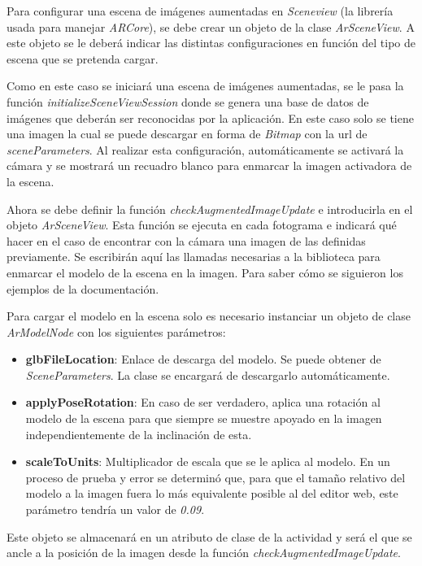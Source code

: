 Para configurar una escena de imágenes aumentadas en \textit{Sceneview} (la librería usada para manejar \textit{ARCore}), se debe crear un objeto de la clase \textit{ArSceneView}. A este objeto se le deberá indicar las distintas configuraciones en función del tipo de escena que se pretenda cargar.

Como en este caso se iniciará una escena de imágenes aumentadas, se le pasa la función \textit{initializeSceneViewSession} donde se genera una base de datos de imágenes que deberán ser reconocidas por la aplicación. En este caso solo se tiene una imagen la cual se puede descargar en forma de \textit{Bitmap} con la url de \textit{sceneParameters}. Al realizar esta configuración, automáticamente se activará la cámara y se mostrará un recuadro blanco para enmarcar la imagen activadora de la escena.

Ahora se debe definir la función \textit{checkAugmentedImageUpdate} e introducirla en el objeto \textit{ArSceneView}. Esta función se ejecuta en cada fotograma e indicará qué hacer en el caso de encontrar con la cámara una imagen de las definidas previamente. Se escribirán aquí las llamadas necesarias a la biblioteca para enmarcar el modelo de la escena en la imagen. Para saber cómo se siguieron los ejemplos de la documentación.

Para cargar el modelo en la escena solo es necesario instanciar un objeto de clase \textit{ArModelNode} con los siguientes parámetros:

\begin{itemize}
    \item \textbf{glbFileLocation}: Enlace de descarga del modelo. Se puede obtener de \textit{SceneParameters}. La clase se encargará de descargarlo automáticamente.
    \item \textbf{applyPoseRotation}: En caso de ser verdadero, aplica una rotación al modelo de la escena para que siempre se muestre apoyado en la imagen independientemente de la inclinación de esta.
    \item \textbf{scaleToUnits}: Multiplicador de escala que se le aplica al modelo. En un proceso de prueba y error se determinó que, para que el tamaño relativo del modelo a la imagen fuera lo más equivalente posible al del editor web, este parámetro tendría un valor de \textit{0.09}.
\end{itemize}

Este objeto se almacenará en un atributo de clase de la actividad y será el que se ancle a la posición de la imagen desde la función \textit{checkAugmentedImageUpdate}.

